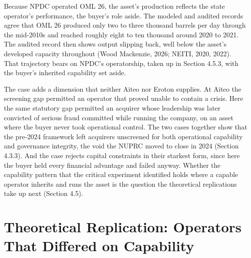 \documentclass[twoside,fontset=lmodern]{mitthesis}
\begin{document}
Because NPDC operated OML 26, the asset's production reflects the state
operator's performance, the buyer's role aside. The modeled and audited
records agree that OML 26 produced only two to three thousand barrels
per day through the mid-2010s and reached roughly eight to ten thousand
around 2020 to 2021. The audited record then shows output slipping back,
well below the asset's developed capacity throughout (Wood Mackenzie,
2026; NEITI, 2020, 2022). That trajectory bears on NPDC's operatorship,
taken up in Section 4.5.3, with the buyer's inherited capability set
aside.

The case adds a dimension that neither Aiteo nor Eroton supplies. At
Aiteo the screening gap permitted an operator that proved unable to
contain a crisis. Here the same statutory gap permitted an acquirer
whose leadership was later convicted of serious fraud committed while
running the company, on an asset where the buyer never took operational
control. The two cases together show that the pre-2024 framework left
acquirers unscreened for both operational capability and governance
integrity, the void the NUPRC moved to close in 2024 (Section 4.3.3).
And the case rejects capital constraints in their starkest form, since
here the buyer held every financial advantage and failed anyway. Whether
the capability pattern that the critical experiment identified holds
where a capable operator inherits and runs the asset is the question the
theoretical replications take up next (Section 4.5).

\hypertarget{theoretical-replication-operators-that-differed-on-capability}{%
\section{Theoretical Replication: Operators That Differed on
Capability}\label{theoretical-replication-operators-that-differed-on-capability}}
\end{document}
